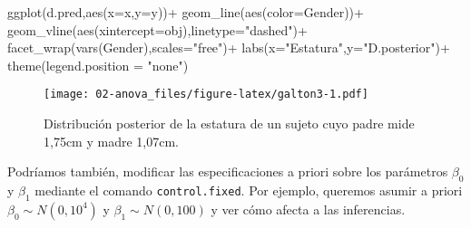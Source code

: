 \documentclass[
]{book}
\newenvironment{Shaded}{\begin{snugshade}}{\end{snugshade}}
\newcommand{\AttributeTok}[1]{\textcolor[rgb]{0.77,0.63,0.00}{#1}}
\newcommand{\CommentTok}[1]{\textcolor[rgb]{0.56,0.35,0.01}{\textit{#1}}}
\newcommand{\DecValTok}[1]{\textcolor[rgb]{0.00,0.00,0.81}{#1}}
\newcommand{\FloatTok}[1]{\textcolor[rgb]{0.00,0.00,0.81}{#1}}
\newcommand{\FunctionTok}[1]{\textcolor[rgb]{0.00,0.00,0.00}{#1}}
\newcommand{\NormalTok}[1]{#1}
\newcommand{\OtherTok}[1]{\textcolor[rgb]{0.56,0.35,0.01}{#1}}
\newcommand{\SpecialCharTok}[1]{\textcolor[rgb]{0.00,0.00,0.00}{#1}}
\newcommand{\StringTok}[1]{\textcolor[rgb]{0.31,0.60,0.02}{#1}}
\begin{document}
\begin{Shaded}
\begin{Highlighting}[]
\FunctionTok{ggplot}\NormalTok{(d.pred,}\FunctionTok{aes}\NormalTok{(}\AttributeTok{x=}\NormalTok{x,}\AttributeTok{y=}\NormalTok{y))}\SpecialCharTok{+}
  \FunctionTok{geom\_line}\NormalTok{(}\FunctionTok{aes}\NormalTok{(}\AttributeTok{color=}\NormalTok{Gender))}\SpecialCharTok{+}
  \FunctionTok{geom\_vline}\NormalTok{(}\FunctionTok{aes}\NormalTok{(}\AttributeTok{xintercept=}\NormalTok{obj),}\AttributeTok{linetype=}\StringTok{"dashed"}\NormalTok{)}\SpecialCharTok{+}
  \FunctionTok{facet\_wrap}\NormalTok{(}\FunctionTok{vars}\NormalTok{(Gender),}\AttributeTok{scales=}\StringTok{"free"}\NormalTok{)}\SpecialCharTok{+}
  \FunctionTok{labs}\NormalTok{(}\AttributeTok{x=}\StringTok{"Estatura"}\NormalTok{,}\AttributeTok{y=}\StringTok{"D.posterior"}\NormalTok{)}\SpecialCharTok{+}
    \FunctionTok{theme}\NormalTok{(}\AttributeTok{legend.position =} \StringTok{"none"}\NormalTok{)}
\end{Highlighting}
\end{Shaded}

\begin{figure}
\centering
\texttt{[image: 02-anova\_files/figure-latex/galton3-1.pdf]}
\caption{\label{fig:galton3}Distribución posterior de la estatura de un sujeto cuyo padre mide 1,75cm y madre 1,07cm.}
\end{figure}

Podríamos también, modificar las especificaciones a priori sobre los parámetros \(\beta_0\) y \(\beta_1\) mediante el comando \texttt{control.fixed}. Por ejemplo, queremos asumir a priori \(\beta_0\sim N(0,10^4)\) y \(\beta_1\sim N(0,100)\) y ver cómo afecta a las inferencias.

\begin{Shaded}
\end{Shaded}
\end{document}

